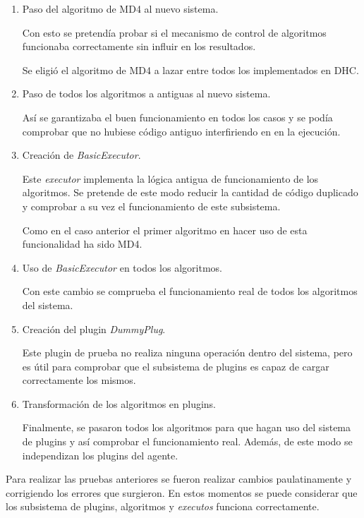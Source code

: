 \begin{enumerate}
	\item Paso del algoritmo de MD4 al nuevo sistema.
	
	Con esto se pretendía probar si el mecanismo de control de algoritmos funcionaba correctamente sin influir en los resultados.
	
	Se eligió el algoritmo de MD4 a lazar entre todos los implementados en DHC.
	
	\item Paso de todos los algoritmos a antiguas al nuevo sistema.
	
	Así se garantizaba el buen funcionamiento en todos los casos y se podía comprobar que no hubiese código antiguo interfiriendo en en la ejecución.
	
	\item Creación de \emph{BasicExecutor}.
	
	Este \emph{executor} implementa la lógica antigua de funcionamiento de los algoritmos. Se pretende de este modo reducir la cantidad de código duplicado y comprobar a su vez el funcionamiento de este subsistema.
	
	Como en el caso anterior el primer algoritmo en hacer uso de esta funcionalidad ha sido MD4.
	
	\item Uso de \emph{BasicExecutor} en todos los algoritmos.
	
	Con este cambio se comprueba el funcionamiento real de todos los algoritmos del sistema.
	
	\item Creación del plugin \emph{DummyPlug}.
	
	Este plugin de prueba no realiza ninguna operación dentro del sistema, pero es útil para comprobar que el subsistema de plugins es capaz de cargar correctamente los mismos.
	
	\item Transformación de los algoritmos en plugins.
	
	Finalmente, se pasaron todos los algoritmos para que hagan uso del sistema de plugins y así comprobar el funcionamiento real. Además, de este modo se independizan los plugins del agente.
\end{enumerate}

Para realizar las pruebas anteriores se fueron realizar cambios paulatinamente y corrigiendo los errores que surgieron. En estos momentos se puede considerar que los subsistema de plugins, algoritmos y \emph{executos} funciona correctamente.

